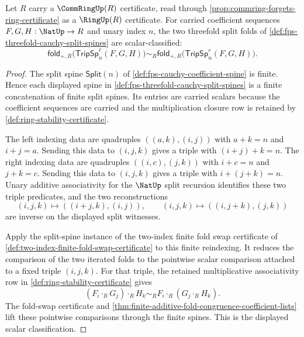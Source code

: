 \begin{lemma}
\label{lem:fps-threefold-cauchy-split-reassociation}
Let $R$ carry a $\CommRingUp(R)$ certificate, read through \autoref{prop:commring-forgets-ring-certificate} as a $\RingUp(R)$ certificate. For carried coefficient sequences $F,G,H:\NatUp\to R$ and unary index $n$, the two threefold split folds of \autoref{def:fps-threefold-cauchy-split-spines} are scalar-classified:
$$
\mathsf{fold}_{+,R}\bigl(\mathsf{TripSp}^{\ell}_n(F,G,H)\bigr)
\sim_R
\mathsf{fold}_{+,R}\bigl(\mathsf{TripSp}^{r}_n(F,G,H)\bigr).
$$
\end{lemma}
\begin{proof}
The split spine $\mathsf{Split}(n)$ of \autoref{def:fps-cauchy-coefficient-spine} is finite. Hence each displayed spine in \autoref{def:fps-threefold-cauchy-split-spines} is a finite concatenation of finite split spines. Its entries are carried scalars because the coefficient sequences are carried and the multiplication closure row is retained by \autoref{def:ring-stability-certificate}.

The left indexing data are quadruples $((a,k),(i,j))$ with $a+k=n$ and $i+j=a$. Sending this data to $(i,j,k)$ gives a triple with $(i+j)+k=n$. The right indexing data are quadruples $((i,c),(j,k))$ with $i+c=n$ and $j+k=c$. Sending this data to $(i,j,k)$ gives a triple with $i+(j+k)=n$. Unary additive associativity for the $\NatUp$ split recursion identifies these two triple predicates, and the two reconstructions
$$
(i,j,k)\mapsto((i+j,k),(i,j)),
\qquad
(i,j,k)\mapsto((i,j+k),(j,k))
$$
are inverse on the displayed split witnesses.

Apply the split-spine instance of the two-index finite fold swap certificate of \autoref{def:two-index-finite-fold-swap-certificate} to this finite reindexing. It reduces the comparison of the two iterated folds to the pointwise scalar comparison attached to a fixed triple $(i,j,k)$. For that triple, the retained multiplicative associativity row in \autoref{def:ring-stability-certificate} gives
$$
(F_i\cdot_R G_j)\cdot_R H_k
\sim_R
F_i\cdot_R(G_j\cdot_R H_k).
$$
The fold-swap certificate and \autoref{thm:finite-additive-fold-congruence-coefficient-lists} lift these pointwise comparisons through the finite spines. This is the displayed scalar classification.
\end{proof}

